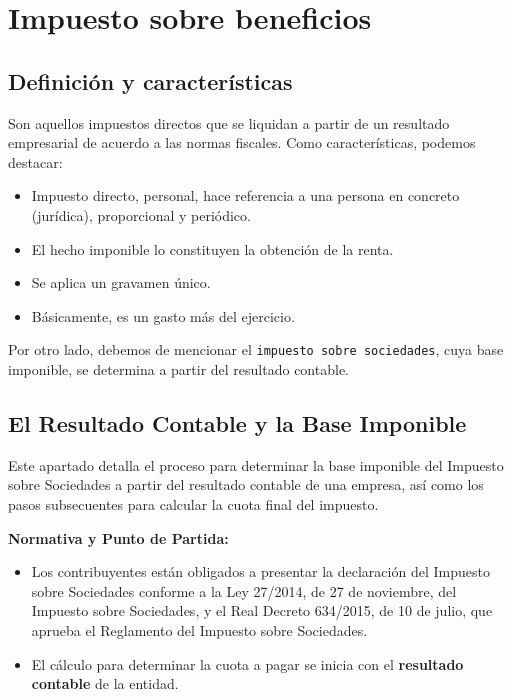\documentclass[
  paper=a4,
  ,captions=tableheading
]{scrbook}
\providecommand{\tightlist}{%
  \setlength{\itemsep}{0pt}\setlength{\parskip}{0pt}}
\begin{document}
\hypertarget{impuesto-sobre-beneficios}{%
\chapter{Impuesto sobre beneficios}\label{impuesto-sobre-beneficios}}

\hypertarget{definiciuxf3n-y-caracteruxedsticas}{%
\section{Definición y
características}\label{definiciuxf3n-y-caracteruxedsticas}}

Son aquellos impuestos directos que se liquidan a partir de un resultado
empresarial de acuerdo a las normas fiscales. Como características,
podemos destacar:

\begin{itemize}
\tightlist
\item
  Impuesto directo, personal, hace referencia a una persona en concreto
  (jurídica), proporcional y periódico.
\item
  El hecho imponible lo constituyen la obtención de la renta.
\item
  Se aplica un gravamen único.
\item
  Básicamente, es un gasto más del ejercicio.
\end{itemize}

Por otro lado, debemos de mencionar el
\texttt{impuesto\ sobre\ sociedades}, cuya base imponible, se determina
a partir del resultado contable.

\hypertarget{el-resultado-contable-y-la-base-imponible}{%
\section{El Resultado Contable y la Base
Imponible}\label{el-resultado-contable-y-la-base-imponible}}

Este apartado detalla el proceso para determinar la base imponible del
Impuesto sobre Sociedades a partir del resultado contable de una
empresa, así como los pasos subsecuentes para calcular la cuota final
del impuesto.

\textbf{Normativa y Punto de Partida:}

\begin{itemize}
\tightlist
\item
  Los contribuyentes están obligados a presentar la declaración del
  Impuesto sobre Sociedades conforme a la Ley 27/2014, de 27 de
  noviembre, del Impuesto sobre Sociedades, y el Real Decreto 634/2015,
  de 10 de julio, que aprueba el Reglamento del Impuesto sobre
  Sociedades.
\item
  El cálculo para determinar la cuota a pagar se inicia con el
  \textbf{resultado contable} de la entidad.
\end{itemize}
\end{document}
